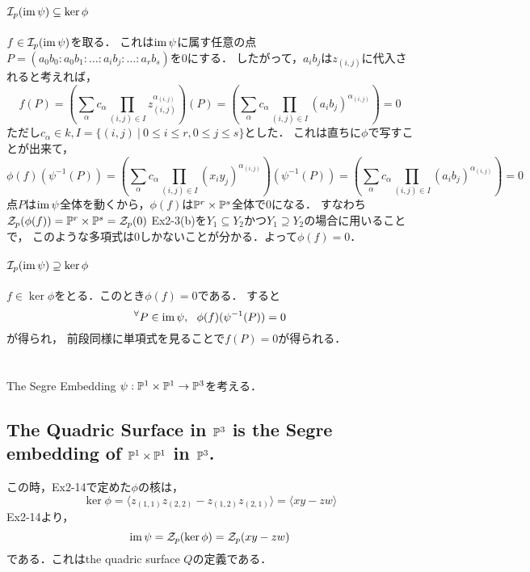 \documentclass[a4paper]{jsarticle}
\begin{document}
    \paragraph{$\mathcal{I}_p(\operatorname{im} \psi) \subseteq \ker \phi$}
    $f \in \mathcal{I}_p(\operatorname{im} \psi)$を取る．
    これは$\operatorname{im} \psi$に属す任意の点$P=(a_0 b_0: a_0 b_1: \dots: a_i b_j: \dots: a_r b_s)$を0にする．
    したがって，$a_i b_j$は$z_{(i,j)}$に代入されると考えれば，
    \[
        f(P)
        =\left( \sum_{\alpha}{c_{\alpha} \prod_{(i,j) \in I}{z_{(i,j)}^{\alpha_{(i,j)}}}} \right)(P)
        =\left( \sum_{\alpha}{c_{\alpha} \prod_{(i,j) \in I}{(a_i b_j)^{\alpha_{(i,j)}}}} \right)
        =0
    \]
    ただし$c_{\alpha} \in k, I=\{(i,j) ~|~ 0 \leq i \leq r, 0 \leq j \leq s\}$とした．
    これは直ちに$\phi$で写すことが出来て，
    \[
        \phi(f)(\psi^{-1}(P))
        =\left( \sum_{\alpha}{c_{\alpha} \prod_{(i,j) \in I}{(x_i y_j)^{\alpha_{(i,j)}}}} \right)(\psi^{-1}(P))
        =\left( \sum_{\alpha}{c_{\alpha} \prod_{(i,j) \in I}{(a_i b_j)^{\alpha_{(i,j)}}}} \right)
        =0
    \]
    点$P$は$\operatorname{im} \psi$全体を動くから，$\phi(f)$は$\mathbb{P}^r \times \mathbb{P}^s$全体で0になる．
    すなわち$\mathcal{Z}_p(\phi(f))=\mathbb{P}^r \times \mathbb{P}^s=\mathcal{Z}_p(0)$
    Ex2-3(b)を$Y_1 \subseteq Y_2$かつ$Y_1 \supseteq Y_2$の場合に用いることで，
    このような多項式は0しかないことが分かる．よって$\phi(f)=0$．

    \paragraph{$\mathcal{I}_p(\operatorname{im} \psi) \supseteq \ker \phi$}
    $f \in \ker \phi$をとる．このとき$\phi(f)=0$である．
    すると\[ {}^{\forall} P \in \operatorname{im} \psi,~~ \phi(f)(\psi^{-1}(P))=0 \]が得られ，
    前段同様に単項式を見ることで$f(P)=0$が得られる．

\section{ } %
    The Segre Embedding $\psi: \mathbb{P}^1 \times \mathbb{P}^1 \to \mathbb{P}^3$を考える．

    \subsection{The Quadric Surface in $\mathbb{P}^3$ is the Segre embedding of $\mathbb{P}^1 \times \mathbb{P}^1$ in $\mathbb{P}^3$.}
    この時，Ex2-14で定めた$\phi$の核は，
    \[ \ker \phi=\langle z_{(1,1)}z_{(2,2)}-z_{(1,2)}z_{(2,1)} \rangle=\langle xy-zw \rangle \]
    Ex2-14より，
    \[ \operatorname{im} \psi=\mathcal{Z}_p(\ker \phi)=\mathcal{Z}_p(xy-zw) \]
    である．これはthe quadric surface $Q$の定義である．
\end{document}
